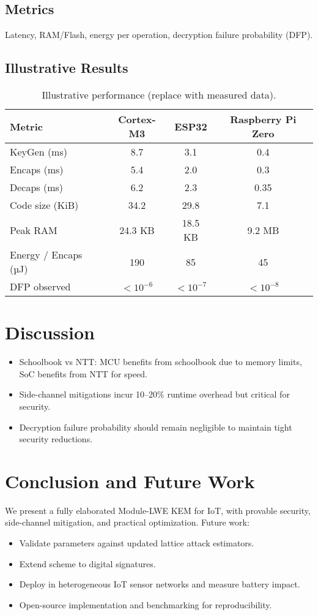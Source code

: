 \documentclass[conference]{IEEEtran}
\begin{document}
\subsection{Metrics}
Latency, RAM/Flash, energy per operation, decryption failure probability (DFP).

\subsection{Illustrative Results}
\begin{table}[H]
\centering
\begin{tabular}{@{}lccc@{}}
\toprule
Metric & Cortex-M3 & ESP32 & Raspberry Pi Zero \\ \midrule
KeyGen (ms) & 8.7 & 3.1 & 0.4 \\
Encaps (ms) & 5.4 & 2.0 & 0.3 \\
Decaps (ms) & 6.2 & 2.3 & 0.35 \\
Code size (KiB) & 34.2 & 29.8 & 7.1 \\
Peak RAM & 24.3 KB & 18.5 KB & 9.2 MB \\
Energy / Encaps (µJ) & 190 & 85 & 45 \\
DFP observed & $<10^{-6}$ & $<10^{-7}$ & $<10^{-8}$ \\
\bottomrule
\end{tabular}
\caption{Illustrative performance (replace with measured data).}
\end{table}

\section{Discussion}
\begin{itemize}
    \item Schoolbook vs NTT: MCU benefits from schoolbook due to memory limits, SoC benefits from NTT for speed.
    \item Side-channel mitigations incur 10–20\% runtime overhead but critical for security.
    \item Decryption failure probability should remain negligible to maintain tight security reductions.
\end{itemize}

\section{Conclusion and Future Work}
We present a fully elaborated Module-LWE KEM for IoT, with provable security, side-channel mitigation, and practical optimization. Future work:
\begin{itemize}
    \item Validate parameters against updated lattice attack estimators.
    \item Extend scheme to digital signatures.
    \item Deploy in heterogeneous IoT sensor networks and measure battery impact.
    \item Open-source implementation and benchmarking for reproducibility.
\end{itemize}
\end{document}
